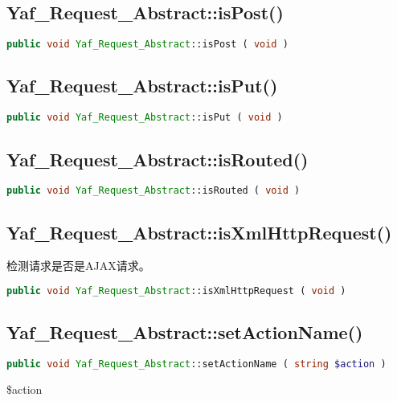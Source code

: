 \subsection{Yaf\_Request\_Abstract::isPost()}

\begin{lstlisting}[language=PHP]
public void Yaf_Request_Abstract::isPost ( void )
\end{lstlisting}

\subsection{Yaf\_Request\_Abstract::isPut()}

\begin{lstlisting}[language=PHP]
public void Yaf_Request_Abstract::isPut ( void )
\end{lstlisting}


\subsection{Yaf\_Request\_Abstract::isRouted()}

\begin{lstlisting}[language=PHP]
public void Yaf_Request_Abstract::isRouted ( void )
\end{lstlisting}

\subsection{Yaf\_Request\_Abstract::isXmlHttpRequest()}

检测请求是否是AJAX请求。

\begin{lstlisting}[language=PHP]
public void Yaf_Request_Abstract::isXmlHttpRequest ( void )
\end{lstlisting}


\subsection{Yaf\_Request\_Abstract::setActionName()}

\begin{lstlisting}[language=PHP]
public void Yaf_Request_Abstract::setActionName ( string $action )
\end{lstlisting}

\begin{compactitem}
\item \$action
\end{compactitem}



